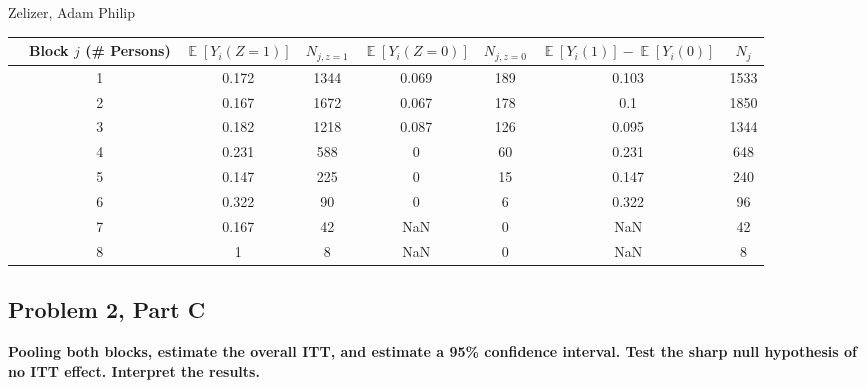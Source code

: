 \documentclass[11pt,notitlepage]{article}
\def\E{\mathop{\mathbb{E}}}
\begin{document}
Zelizer, Adam Philip


\begin{table}[h!]\small
\begin{center}
\begin{tabular}{rc|cc|cc|cc}
  \hline
 & Block $j$ (\# Persons) & $\E[Y_i(Z=1)]$ & $N_{j, z=1}$ & $\E[Y_i(Z=0)]$ & $N_{j, z=0}$ & $\E[Y_i(1)]-\E[Y_i(0)]$ & $N_j$ \\ 
  \hline
  & 1 & 0.172 & 1344 & 0.069 & 189 & 0.103 & 1533 \\ 
  & 2 & 0.167 & 1672 & 0.067 & 178 & 0.1 & 1850 \\ 
  & 3 & 0.182 & 1218 & 0.087 & 126 & 0.095 & 1344 \\ 
  & 4 & 0.231 & 588 & 0 & 60 & 0.231 & 648 \\ 
  & 5 & 0.147 & 225 & 0 & 15 & 0.147 & 240 \\ 
  & 6 & 0.322 & 90 & 0 & 6 & 0.322 & 96 \\ 
  & 7 & 0.167 & 42 & NaN & 0 & NaN & 42 \\ 
  & 8 & 1 & 8 & NaN & 0 & NaN & 8 \\ 
   \hline
\end{tabular}
\end{center}
\end{table}

\clearpage

\subsection{Problem 2, Part C} {\bf Pooling both blocks, estimate the overall ITT, and estimate a 95\% confidence interval.  Test the sharp null hypothesis of no ITT effect.  Interpret the results.}

\vspace{1cm}
\end{document}
